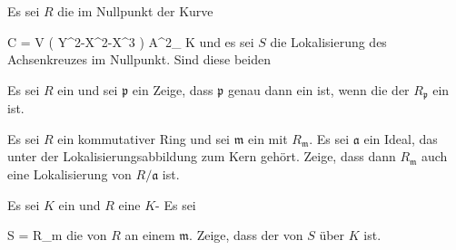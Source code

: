 {}
{





Es sei $R$ die
im Nullpunkt der Kurve

\mavergleichskettedisp
{\vergleichskette
{ C
}
{ =} { V \left(  Y^2-X^2-X^3  \right)
}
{ \subseteq} { {\mathbb A}^{2}_{ K }
}
{ } {
}
{ } {
}
}
{}{}{}
und es sei $S$ die Lokalisierung des Achsenkreuzes im Nullpunkt. Sind diese beiden





}
{} {}

{}
{





Es sei $R$ ein
und sei ${\mathfrak p}$ ein
Zeige, dass ${\mathfrak p}$ genau dann ein
ist, wenn die
der
$R_{\mathfrak p}$ ein
ist.





}
{} {}

{}
{





Es sei $R$ ein kommutativer Ring und sei ${\mathfrak m}$ ein
 mit
 $R_{\mathfrak m}$. Es sei ${\mathfrak a}$ ein Ideal, das unter der Lokalisierungsabbildung zum Kern gehört. Zeige, dass dann $R_{\mathfrak m}$ auch eine Lokalisierung von $R/{\mathfrak a}$ ist.





}
{} {}

{}
{





Es sei $K$ ein
 und $R$ eine
$K$-
Es sei

\mavergleichskette
{\vergleichskette
{ S
}
{ = }{ R_{\mathfrak m}
}
{  }{
}
{    }{
}
{   }{
}
}
{}{}{}
die
von $R$ an einem
${\mathfrak m}$. Zeige, dass der
von $S$
über $K$ ist.





}
{} {}

